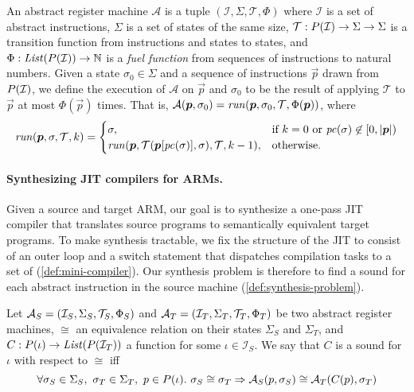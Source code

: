 \begin{definition}\label{def:arm}
  An \textup{abstract register machine} $\mathcal{A}$ is a tuple $(\mathcal{I},
  \Sigma, \mathcal{T}, \Phi)$  where $\mathcal{I}$ is a set of abstract
  instructions, $\Sigma$ is a set of states of the same size, $\mathcal{T} :
  P(\mathcal{I}) \rightarrow \Sigma \rightarrow \Sigma$ is a
  \textup{transition function} from instructions and states to states, and
  $\Phi: \mathit{List}(P(\mathcal{I})) \rightarrow \mathbb{N}$ is a
  \emph{fuel function} from sequences of instructions to natural numbers. Given
  a state $\sigma_0\in\Sigma$ and a sequence of instructions $\vec{p}$ drawn
  from $P(\mathcal{I})$, we define the \textup{execution} of $\mathcal{A}$
  on $\vec{p}$ and $\sigma_0$ to be the result of applying $\mathcal{T}$ to
  $\vec{p}$ at most $\Phi(\vec{p})$ times. That is, $\mathcal{A}(\boldsymbol{p}, \sigma_0) =
  \mathit{run}(\boldsymbol{p}, \sigma_0, \mathcal{T}, \Phi(\boldsymbol{p}))$, where  
  \[
    \mathit{run}(\boldsymbol{p}, \sigma, \mathcal{T}, k) = 
    \begin{cases}
        \sigma,& \text{if } k = 0 \text{ or } \mathit{pc}(\sigma) \not\in [0, |\boldsymbol{p}|)\\
        \mathit{run}(\boldsymbol{p}, \mathcal{T}(\boldsymbol{p}[\mathit{pc}(\sigma)], \sigma), \mathcal{T}, k-1),   & \text{otherwise.}
    \end{cases}
  \]
\end{definition}

\paragraph{Synthesizing JIT compilers for ARMs.} Given a source and target ARM,
our goal is to synthesize a one-pass JIT compiler that translates source
programs to semantically equivalent target programs. To make synthesis
tractable, we fix the structure of the JIT to consist of an outer loop and a
switch statement that dispatches compilation tasks to a set of
\emph{\minicompilers} (\autoref{def:mini-compiler}). Our synthesis
problem is therefore to find a sound \minicompiler for each abstract
instruction in the source machine (\autoref{def:synthesis-problem}).\tighten

\begin{definition}[\MiniCompiler]\label{def:mini-compiler}
Let $\mathcal{A}_S = (\mathcal{I}_S, \Sigma_S, \mathcal{T}_S, \Phi_S)$ and
$\mathcal{A}_T = (\mathcal{I}_T, \Sigma_T, \\ \mathcal{T}_T, \Phi_T)$ be two abstract register
machines, $\cong$ an equivalence relation on their states $\Sigma_S$ and
$\Sigma_T$, and $C: P(\iota) \rightarrow
\mathit{List}(P(\mathcal{I}_T))$ a function for some
$\iota\in\mathcal{I}_S$. We say that $C$ is a \textup{sound \minicompiler} for
$\iota$ with respect to $\cong$ iff
\[
    \forall \sigma_S\in\Sigma_S,\ \sigma_T\in\Sigma_T,\ p\in\prog{\iota}. \ 
            \sigma_S \cong \sigma_T \Rightarrow
                 \arm_S(p, \sigma_S) \cong \arm_T(C(p), \sigma_T)
\]
\end{definition} 

